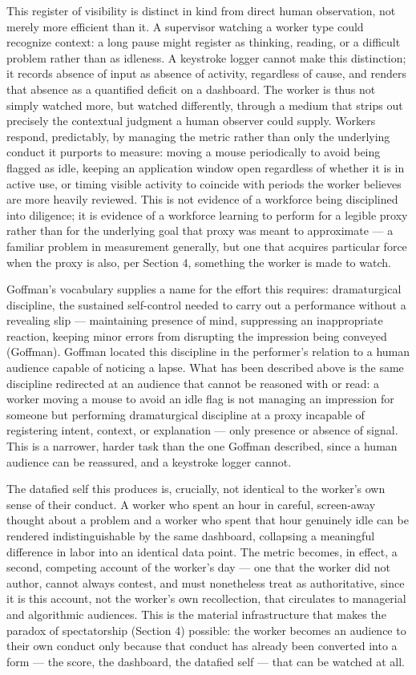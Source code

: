 \documentclass[12pt]{article}
\begin{document}
This register of visibility is distinct in kind from direct human observation, not merely more efficient than it. A supervisor watching a worker type could recognize context: a long pause might register as thinking, reading, or a difficult problem rather than as idleness. A keystroke logger cannot make this distinction; it records absence of input as absence of activity, regardless of cause, and renders that absence as a quantified deficit on a dashboard. The worker is thus not simply watched more, but watched differently, through a medium that strips out precisely the contextual judgment a human observer could supply. Workers respond, predictably, by managing the metric rather than only the underlying conduct it purports to measure: moving a mouse periodically to avoid being flagged as idle, keeping an application window open regardless of whether it is in active use, or timing visible activity to coincide with periods the worker believes are more heavily reviewed. This is not evidence of a workforce being disciplined into diligence; it is evidence of a workforce learning to perform for a legible proxy rather than for the underlying goal that proxy was meant to approximate --- a familiar problem in measurement generally, but one that acquires particular force when the proxy is also, per Section 4, something the worker is made to watch.

Goffman's vocabulary supplies a name for the effort this requires: dramaturgical discipline, the sustained self-control needed to carry out a performance without a revealing slip --- maintaining presence of mind, suppressing an inappropriate reaction, keeping minor errors from disrupting the impression being conveyed (Goffman). Goffman located this discipline in the performer's relation to a human audience capable of noticing a lapse. What has been described above is the same discipline redirected at an audience that cannot be reasoned with or read: a worker moving a mouse to avoid an idle flag is not managing an impression for someone but performing dramaturgical discipline at a proxy incapable of registering intent, context, or explanation --- only presence or absence of signal. This is a narrower, harder task than the one Goffman described, since a human audience can be reassured, and a keystroke logger cannot.

The datafied self this produces is, crucially, not identical to the worker's own sense of their conduct. A worker who spent an hour in careful, screen-away thought about a problem and a worker who spent that hour genuinely idle can be rendered indistinguishable by the same dashboard, collapsing a meaningful difference in labor into an identical data point. The metric becomes, in effect, a second, competing account of the worker's day --- one that the worker did not author, cannot always contest, and must nonetheless treat as authoritative, since it is this account, not the worker's own recollection, that circulates to managerial and algorithmic audiences. This is the material infrastructure that makes the paradox of spectatorship (Section 4) possible: the worker becomes an audience to their own conduct only because that conduct has already been converted into a form --- the score, the dashboard, the datafied self --- that can be watched at all.
\end{document}
